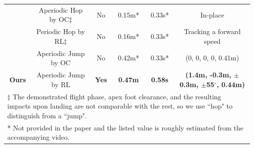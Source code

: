 \begin{table}[]
\begin{tabular}{ccccccc}
\cite{yang2021impact} & Aperiodic Hop by OC$\ddagger$ & No & 0.15m* & 0.33s* & \multicolumn{2}{c}{In-place} \\ %
\cite{siekmann2021sim} & Periodic Hop by RL$\ddagger$ & No & 0.16m* & 0.33s* & \multicolumn{2}{c}{Tracking a forward speed} \\ %
\cite{yang2023impact} & Aperiodic Jump by OC & No & 0.42m* & 0.33s* & \multicolumn{2}{c}{(0, 0, 0, 0, 0.41m)} \\
\textbf{Ours} & Aperiodic Jump by RL & \textbf{Yes} & \textbf{0.47m} & \textbf{0.58s} & \multicolumn{2}{c}{\textbf{(1.4m, -0.3m, $\pm$0.3m, $\pm$55$^\circ$, 0.44m)}} \\
\multicolumn{7}{l}{$\ddagger$ The demonstrated flight phase, apex foot clearance, and the resulting impacts upon landing are not comparable with the rest, so we use “hop" to distinguish from a “jump".} \\ 
\multicolumn{7}{l}{* Not provided in the paper and the listed value is roughly estimated from the accompanying video.} \\
\hline
\end{tabular}
\end{table}
